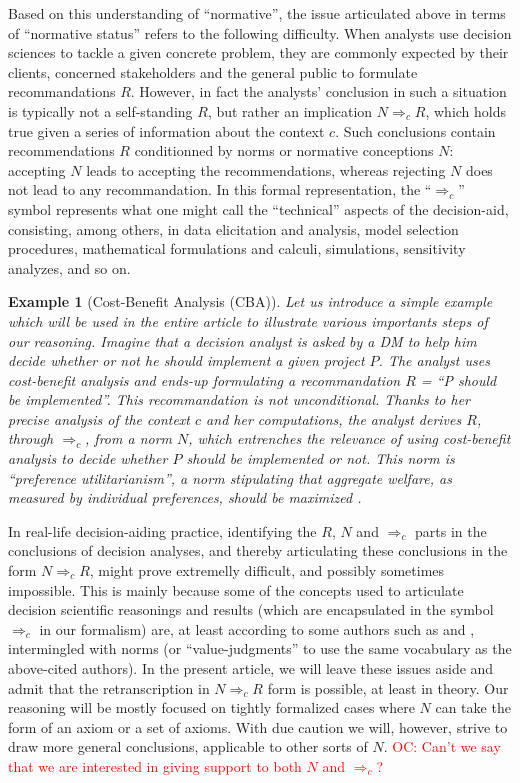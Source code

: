 \documentclass[preprint, french, english, 11pt, authoryear]{elsarticle}%
\newtheorem{example}{Example}
\newcommand{\commentOC}[1]{\textcolor{red}{OC: #1}}
\newcommand{\commentOCf}[1]{\textcolor{red}{\selectlanguage{french}{OC : #1}}}
\begin{document}
Based on this understanding of ``normative'', the issue articulated above in terms of ``normative status'' refers to the following difficulty. When analysts use decision sciences to tackle a given concrete problem, they are commonly expected by their clients, concerned stakeholders and the general public to formulate recommandations $R$. However, in fact the analysts' conclusion in such a situation is typically not a self-standing $R$, but rather an implication $N ⇒_c R$, which holds true given a series of information about the context $c$. Such conclusions contain recommendations $R$ conditionned by norms or normative conceptions $N$: accepting  $N$ leads to accepting the recommendations, whereas rejecting $N$ does not lead to any recommandation. In this formal representation, the ``$⇒_c $'' symbol represents what one might call the ``technical'' aspects of the decision-aid, consisting, among others, in data elicitation and analysis, model selection procedures, mathematical formulations and calculi, simulations, sensitivity analyzes, and so on.

\begin{example}[Cost-Benefit Analysis (CBA)]
Let us introduce a simple example which will be used in the entire article to illustrate various importants steps of our reasoning. Imagine that a decision analyst is asked by a \ac{DM} to help him decide whether or not he should implement a given project $P$. The analyst uses cost-benefit analysis \citep{layard_cost-benefit_1994} and ends-up formulating a recommandation $R$ = ``P should be implemented''. This recommandation is not unconditional. Thanks to her precise analysis of the context $c$ and her computations, the analyst derives $R$, through $⇒_c $, from a norm $N$, which entrenches the relevance of using cost-benefit analysis to decide whether $P$ should be implemented or not. This norm is ``preference utilitarianism'', a norm stipulating that aggregate welfare, as measured by individual preferences, should be maximized  \citep{meinard_ethical_2016}.
\end{example}
\commentOCf{J’aime beaucoup cette idée d’un exemple suivi.}

In real-life decision-aiding practice, identifying the $R$, $N$ and $⇒_c$ parts in the conclusions of decision analyses, and thereby articulating these conclusions in the form $N ⇒_c R$, might prove extremelly difficult, and possibly sometimes impossible. This is mainly because some of the concepts used to articulate decision scientific reasonings and results (which are encapsulated in the symbol $⇒_c$ in our formalism) are, at least according to some authors such as \citet{mongin_value_2006} and \citet{baujard_value_2013}, intermingled with norms (or ``value-judgments'' to use the same vocabulary as the above-cited authors). In the present article, we will leave these issues aside and admit that the retranscription in $N ⇒_c R$ form is possible, at least  in theory. Our reasoning will be mostly focused on tightly formalized cases where $N$ can take the form of an axiom or a set of axioms. With due caution we will, however, strive to draw more general conclusions, applicable to other sorts of $N$.
\commentOC{Can’t we say that we are interested in giving support to both $N$ and $⇒_c$?}
\end{document}
